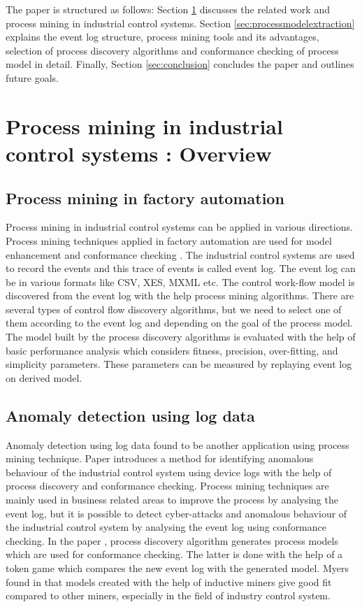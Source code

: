 \begin{bibunit}
   
   The paper is structured as follows: Section \ref{sec:processmininginindustrialcontrolsystem}  discusses the related work and process mining in industrial control systems. Section \ref{sec:processmodelextraction} explains the event log structure, process mining tools and its advantages, selection of process discovery algorithms and conformance checking of process model in detail.  Finally, Section \ref{sec:conclusion} concludes the paper and outlines future goals.
   
   
   \section{Process mining in industrial control systems : Overview}
   \label{sec:processmininginindustrialcontrolsystem}
   \subsection{Process mining in factory automation}
   Process mining in industrial control systems can be applied in various directions. Process mining techniques applied in factory automation are used for model enhancement and conformance checking \cite{paper1}. The industrial control systems are used to record the events and this trace of events is called event log. The  event log can be in various formats like CSV, XES, MXML etc. The control work-flow model is discovered from the event log with the help process mining algorithms. There are several types of control flow discovery algorithms, but we need to select one of them according to the event log and depending on the goal of the process model. The model built by the process discovery algorithms is evaluated with the help of basic performance analysis which considers fitness, precision, over-fitting, and simplicity parameters. These parameters can be measured by replaying event log on derived model.
   
   \subsection{Anomaly detection using log data}
   
   Anomaly detection using log data found to be another application using process mining technique. Paper \cite{paper2} introduces a method for identifying anomalous behaviour of the industrial control system using device logs with the help of process discovery and conformance checking. Process mining techniques are mainly used in business related areas to improve the process by analysing the event log, but it is possible to detect cyber-attacks and anomalous behaviour of the industrial control system by analysing the event log using conformance checking. In the paper \cite{paper2}, process discovery algorithm generates process models which are used for conformance checking. The latter is done with the help of a token game which compares the new event log with the generated model. Myers found in \cite{paper3} that models created with the help of inductive miners give good fit compared to other miners, especially in the field of industry control system.
   

\end{bibunit}
